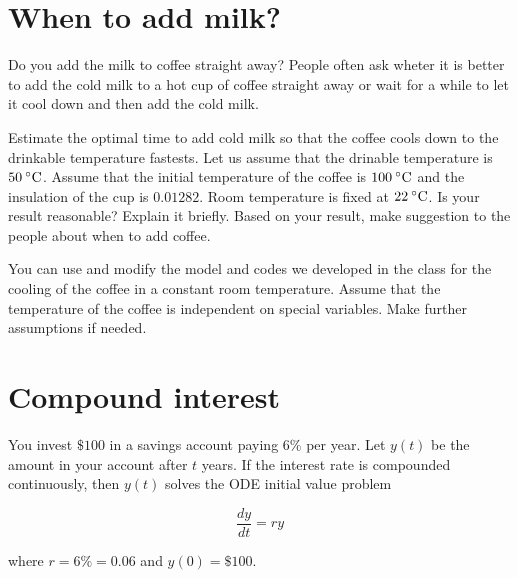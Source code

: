 \documentclass[11pt,oneside]{extarticle}
\newcommand{\Celsius}{\:\degree\mathrm{C}}
\newcommand{\Dollar}{\$}
\newcommand{\percent}{\%}
\begin{document}
\section{When to add milk?}

\par Do you add the milk to coffee straight away? People often ask wheter it is better
to add the cold milk to a hot cup of coffee straight away or wait for a while to
let it cool down and then add the cold milk.

\par Estimate the optimal time to add cold milk so that the coffee cools down to
the drinkable temperature fastests. Let us assume that the drinable temperature
is $50\Celsius$. Assume that the initial temperature of the coffee is $100\Celsius$
and the insulation of the cup is $0.01282$. Room temperature is fixed at $22\Celsius$.
Is your result reasonable? Explain it briefly. Based on your result, make suggestion
to the people about when to add coffee.


\par You can use and modify the model and codes we developed in the class for the
cooling of the coffee in a constant room temperature. Assume that the temperature
of the coffee is independent on special variables. Make further assumptions if needed.

\newpage

\section{Compound interest}

You invest $\Dollar 100$ in a savings account paying $6\percent$ per year. Let
$y(t)$ be the amount in your account after $t$ years. If the interest rate is
compounded continuously, then $y(t)$ solves the ODE initial value problem

$$
\frac{dy}{dt} = ry
$$

where $r=6\percent=0.06$ and $y(0)=\Dollar 100$.
\end{document}
